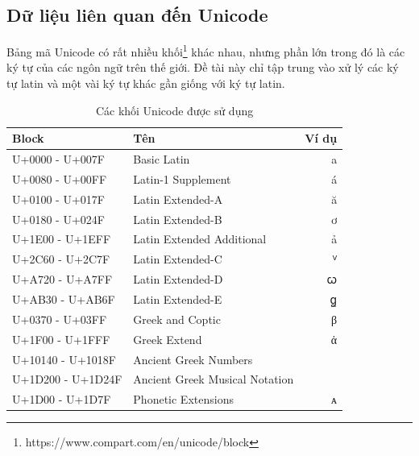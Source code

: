 \subsection*{Dữ liệu liên quan đến Unicode}
Bảng mã Unicode có rất nhiều khối\footnote{https://www.compart.com/en/unicode/block} khác nhau, nhưng phần lớn trong đó là các ký tự của các ngôn ngữ trên thế giới. Đề tài này chỉ tập trung vào xử lý các ký tự latin và một vài ký tự khác gần giống với ký tự latin.
\begin{table}[htb]
    \centering
    \caption{Các khối Unicode được sử dụng}
    \label{table:unicode-blocks}
    \begin{threeparttable}
        \begin{tabular}{llr}
            \toprule
            \textbf{Block}    & \textbf{Tên}                            & \textbf{Ví dụ} \\\midrule
            U+0000 - U+007F   & Basic Latin                             & a              \\
            U+0080 - U+00FF   & Latin-1 Supplement                      & á              \\
            U+0100 - U+017F   & Latin Extended-A                        & ă              \\
            U+0180 - U+024F   & Latin Extended-B                        & ơ              \\
            U+1E00 - U+1EFF   & Latin Extended Additional               & ả              \\
            U+2C60 - U+2C7F   & Latin Extended-C                        & ⱽ              \\
            U+A720 - U+A7FF   & Latin Extended-D                        & ꞷ              \\
            U+AB30 - U+AB6F   & Latin Extended-E                        & ꬶ              \\
            U+0370 - U+03FF   & Greek and Coptic                        & β              \\
            U+1F00 - U+1FFF   & Greek Extend                            & ἀ              \\
            U+10140 - U+1018F & Ancient Greek Numbers\tnote{1}          &                \\
            U+1D200 - U+1D24F & Ancient Greek Musical Notation\tnote{2} &                \\
            U+1D00 - U+1D7F   & Phonetic Extensions                     & ᴀ              \\

\end{tabular}
\end{threeparttable}
\end{table}
